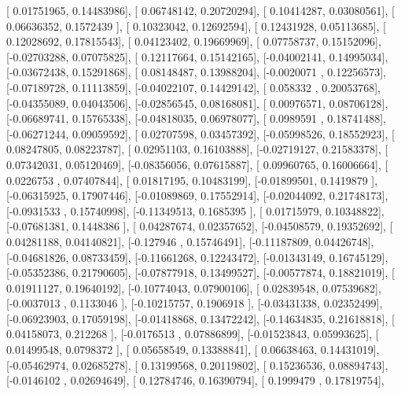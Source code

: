 \documentclass{article}
\begin{document}
       [ 0.01751965,  0.14483986],
       [ 0.06748142,  0.20720294],
       [ 0.10414287,  0.03080561],
       [ 0.06636352,  0.1572439 ],
       [ 0.10323042,  0.12692594],
       [ 0.12431928,  0.05113685],
       [ 0.12028692,  0.17815543],
       [ 0.04123402,  0.19669969],
       [ 0.07758737,  0.15152096],
       [-0.02703288,  0.07075825],
       [ 0.12117664,  0.15142165],
       [-0.04002141,  0.14995034],
       [-0.03672438,  0.15291868],
       [ 0.08148487,  0.13988204],
       [-0.0020071 ,  0.12256573],
       [-0.07189728,  0.11113859],
       [-0.04022107,  0.14429142],
       [ 0.058332  ,  0.20053768],
       [-0.04355089,  0.04043506],
       [-0.02856545,  0.08168081],
       [ 0.00976571,  0.08706128],
       [-0.06689741,  0.15765338],
       [-0.04818035,  0.06978077],
       [ 0.0989591 ,  0.18741488],
       [-0.06271244,  0.09059592],
       [ 0.02707598,  0.03457392],
       [-0.05998526,  0.18552923],
       [ 0.08247805,  0.08223787],
       [ 0.02951103,  0.16103888],
       [-0.02719127,  0.21583378],
       [ 0.07342031,  0.05120469],
       [-0.08356056,  0.07615887],
       [ 0.09960765,  0.16006664],
       [ 0.0226753 ,  0.07407844],
       [ 0.01817195,  0.10483199],
       [-0.01899501,  0.1419879 ],
       [-0.06315925,  0.17907446],
       [-0.01089869,  0.17552914],
       [-0.02044092,  0.21748173],
       [-0.0931533 ,  0.15740998],
       [-0.11349513,  0.1685395 ],
       [ 0.01715979,  0.10348822],
       [-0.07681381,  0.1448386 ],
       [ 0.04287674,  0.02357652],
       [-0.04508579,  0.19352692],
       [ 0.04281188,  0.04140821],
       [-0.127946  ,  0.15746491],
       [-0.11187809,  0.04426748],
       [-0.04681826,  0.08733459],
       [-0.11661268,  0.12243472],
       [-0.01343149,  0.16745129],
       [-0.05352386,  0.21790605],
       [-0.07877918,  0.13499527],
       [-0.00577874,  0.18821019],
       [ 0.01911127,  0.19640192],
       [-0.10774043,  0.07900106],
       [ 0.02839548,  0.07539682],
       [-0.0037013 ,  0.1133046 ],
       [-0.10215757,  0.1906918 ],
       [-0.03431338,  0.02352499],
       [-0.06923903,  0.17059198],
       [-0.01418868,  0.13472242],
       [-0.14634835,  0.21618818],
       [ 0.04158073,  0.212268  ],
       [-0.0176513 ,  0.07886899],
       [-0.01523843,  0.05993625],
       [ 0.01499548,  0.0798372 ],
       [ 0.05658549,  0.13388841],
       [ 0.06638463,  0.14431019],
       [-0.05462974,  0.02685278],
       [ 0.13199568,  0.20119802],
       [ 0.15236536,  0.08894743],
       [-0.0146102 ,  0.02694649],
       [ 0.12784746,  0.16390794],
       [ 0.1999479 ,  0.17819754],
\end{document}
